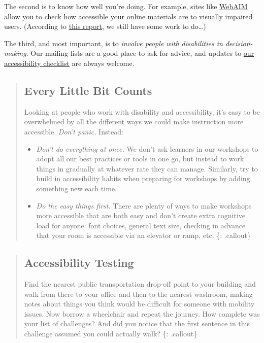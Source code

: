 The second is to know how well you're doing. For example, sites like
\href{http://webaim.org/}{WebAIM} allow you to check how accessible your
online materials are to visually impaired users. (According to
\href{http://wave.webaim.org/report\#/software-carpentry.org}{this
report}, we still have some work to do\ldots{})

The third, and most important, is to \emph{involve people with
disabilities in decision-making}. Our mailing lists are a good place to
ask for advice, and updates to
\href{\{\{\%20site.swc_site\%20\}\}/workshops/checklists/accessibility/}{our
accessibility checklist} are always welcome.

\begin{quote}
\subsection{Every Little Bit Counts}\label{every-little-bit-counts}

Looking at people who work with disability and accessibility, it's easy
to be overwhelmed by all the different ways we could make instruction
more accessible. \emph{Don't panic.} Instead:

\begin{itemize}
\itemsep1pt\parskip0pt
\item
  \emph{Don't do everything at once.} We don't ask learners in our
  workshops to adopt all our best practices or tools in one go, but
  instead to work things in gradually at whatever rate they can manage.
  Similarly, try to build in accessibility habits when preparing for
  workshops by adding something new each time.
\item
  \emph{Do the easy things first.} There are plenty of ways to make
  workshops more accessible that are both easy and don't create extra
  cognitive load for anyone: font choices, general text size, checking
  in advance that your room is accessible via an elevator or ramp, etc.
  \{: .callout\}
\end{itemize}
\end{quote}

\begin{quote}
\subsection{Accessibility Testing}\label{accessibility-testing}

Find the nearest public transportation drop-off point to your building
and walk from there to your office and then to the nearest washroom,
making notes about things you think would be difficult for someone with
mobility issues. Now borrow a wheelchair and repeat the journey. How
complete was your list of challenges? And did you notice that the first
sentence in this challenge assumed you could actually walk? \{:
.callout\}
\end{quote}

